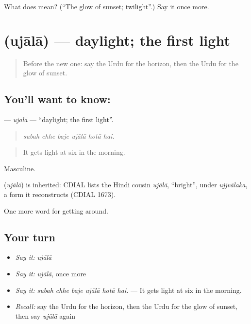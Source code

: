 \begin{tcolorbox}[breakable,colback=teal!4,colframe=teal!35!black,title={Before you move on}]
What does  mean? (\textquotedblleft{}The glow of sunset; twilight\textquotedblright{}.) Say it once more.
\end{tcolorbox}
\section[\texorpdfstring{\ur{اجالا} (ujālā)}{اجالا (ujālā)}]{ (ujālā) — daylight; the first light}

\label{lesson:UR-C432-ujala}



\begin{quote}
Before the new one: say the Urdu for the horizon, then the Urdu for the glow of sunset.
\end{quote}

\subsection*{You'll want to know: }
\textbf{} — \emph{ujālā} — \textquotedblleft{}daylight; the first light\textquotedblright{}.

\begin{quote}
     
\end{quote}

\begin{quote}
\emph{subah chhe baje ujālā hotā hai.}
\end{quote}

\begin{quote}
It gets light at six in the morning.
\end{quote}

Masculine.

\begin{cousinweb}
\textbf{} (\emph{ujālā}) is inherited: CDIAL lists the Hindi cousin \emph{ujālā}, \textquotedblleft{}bright\textquotedblright{}, under \emph{ujjvālaka}, a form it reconstructs (CDIAL 1673).
\end{cousinweb}

\begin{grammarlens}[title={What you've built}]
One more word for getting around.
\end{grammarlens}

\subsection*{Your turn}
\begin{itemize}
\raggedright
  \item \emph{Say it:} \emph{ujālā}
  \item \emph{Say it:} \emph{ujālā}, once more
  \item \emph{Say it:} \emph{subah chhe baje ujālā hotā hai.} — It gets light at six in the morning.
  \item \emph{Recall:} say the Urdu for the horizon, then the Urdu for the glow of sunset, then say \emph{ujālā} again
\end{itemize}

